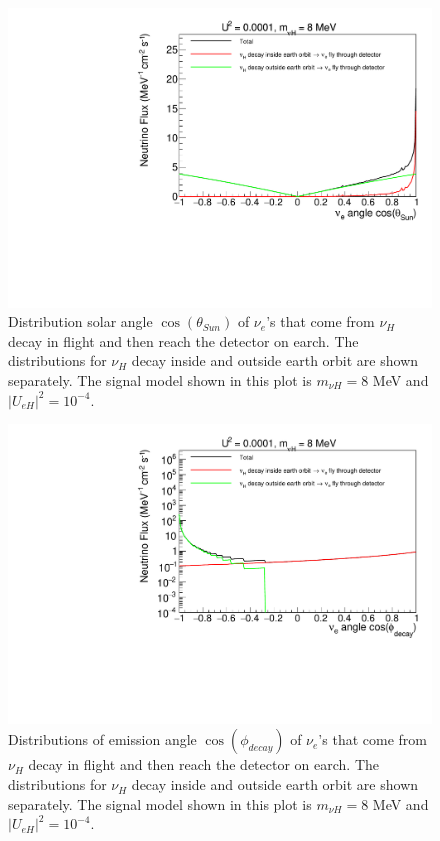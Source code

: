 \documentclass[%
 reprint,
 amsmath,amssymb,
 aps,
 prd,
twocolumn,
]{revtex4-1}
\begin{document}
\begin{figure}[!ht]
\includegraphics[width=0.99\columnwidth]{../plots/DecayInFlightNuLCosthetaSun_U0.0001_M8.0_InsideOutside_linXlinY.pdf}
\caption{Distribution solar angle $\cos(\theta_{Sun})$ of $\nu_e$'s that come from $\nu_H$ decay in flight and then reach the detector on earch. The distributions for $\nu_H$ decay inside and outside earth orbit are shown separately. The signal model shown in this plot is $m_{\nu H} = 8$ MeV and $|U_{eH}|^2 = 10^{-4}$.}
\label{fig:DecayInFlightTheta_U0.0001_M8} 
\end{figure}


\begin{figure}[!ht]
\includegraphics[width=0.99\columnwidth]{../plots/DecayInFlightNuLCosphiSun_U0.0001_M8.0_InsideOutside_linXlogY.pdf}
\caption{Distributions of emission angle $\cos(\phi_{decay})$ of $\nu_e$'s that come from $\nu_H$ decay in flight and then reach the detector on earch. The distributions for $\nu_H$ decay inside and outside earth orbit are shown separately. The signal model shown in this plot is $m_{\nu H} = 8$ MeV and $|U_{eH}|^2 = 10^{-4}$.}
\label{fig:DecayInFlightPhi_U0.0001_M8} 
\end{figure}
\end{document}

